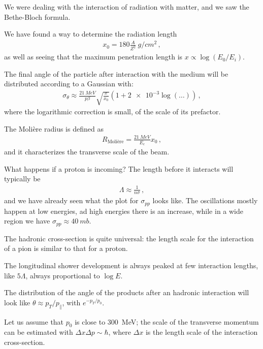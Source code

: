 \documentclass[main.tex]{subfiles}
\begin{document}

We were dealing with the interaction of radiation with matter, and 
we saw the Bethe-Bloch formula. 

We have found a way to determine the radiation length 
%
\begin{align}
x_0 = 180 \frac{A}{Z^2} \SI{}{g/cm^2}
\,,
\end{align}
%
as well as seeing that the maximum penetration length is \(x \propto \log (E_0 / E_i)\). 

The final angle of the particle after interaction with the medium will be 
distributed according to a Gaussian with: 
%
\begin{align}
\sigma _\theta \approx \frac{\SI{21}{MeV}}{p \beta } \sqrt{ \frac{x}{x_0 }} \left(1 + \num{2e-3} \log (\dots)\right)
\,,
\end{align}
%
where the logarithmic correction is small, of the scale of its prefactor. 

The Molière radius is defined as 
%
\begin{align}
R _{\text{Molière}} = \frac{\SI{21}{MeV}}{E_c} x_0 
\,,
\end{align}
%
and it characterizes the transverse scale of the beam. 

What happens if a proton is incoming? 
The length before it interacts will typically be 
%
\begin{align}
\Lambda \approx \frac{1}{n \sigma }
\,,
\end{align}
%
and we have already seen what the plot for \(\sigma_{pp}\) looks like.
The oscillations mostly happen at low energies, ad high energies there is an increase,
while in a wide region we have \(\sigma_{pp} \approx \SI{40}{mb}\). 

The hadronic cross-section is quite universal: the length scale for 
the interaction of a pion is similar to that for a proton. 

The longitudinal shower development is always peaked at few interaction lengths, like \(5 \Lambda \), 
always proportional to \(\log E\). 

The distribution of the angle of the products after an hadronic interaction
will look like \(\theta \approx p_T / p_ \parallel\), with \(e^{- p_T / p_0}\). 

Let us assume that \(p_0 \) is close to \SI{300}{MeV}; 
the scale of the transverse momentum can be estimated with \(\Delta x \Delta p \sim \hbar\), 
where \(\Delta x\) is the length scale of the interaction cross-section. 
\end{document}
